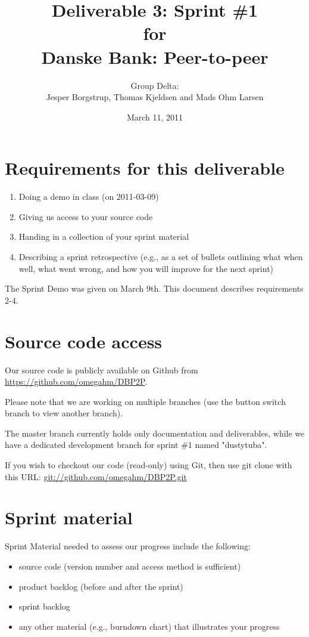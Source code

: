 \documentclass[a4paper,11pt]{article}
\title{Deliverable 3: Sprint \#1\\\small{for}\\\small{Danske Bank: Peer-to-peer}}
\author{ Group Delta:\\Jesper Borgstrup, Thomas Kjeldsen and Mads Ohm Larsen }
\date{March 11, 2011}
\begin{document}
\ifpdf
{}
\else
{}
\fi

\maketitle


\section{Requirements for this deliverable}
\begin{enumerate}
\item Doing a demo in class (on 2011-03-09)
\item Giving us access to your source code
\item Handing in a collection of your sprint material
\item Describing a sprint retrospective (e.g., as a set of bullets outlining what
when well, what went wrong, and how you will improve for the next sprint)
\end{enumerate}

The Sprint Demo was given on March 9th. This document describes requirements 2-4.

\section{Source code access}
Our source code is publicly available on Github from \url{https://github.com/omegahm/DBP2P}.

Please note that we are working on multiple branches (use the button switch branch to view another branch).

The master branch currently holds only documentation and deliverables, while we have a dedicated development branch for sprint \#1 named "dustytuba".

If you wish to checkout our code (read-only) using Git, then use git clone with this URL:
\url{git://github.com/omegahm/DBP2P.git}


\section{Sprint material}
Sprint Material needed to assess our progress include the following:
\begin{itemize}
\item source code (version number and access method is sufficient)
\item product backlog (before and after the sprint)
\item sprint backlog
\item any other material (e.g., burndown chart) that illustrates your progress
\end{itemize}
\end{document}
